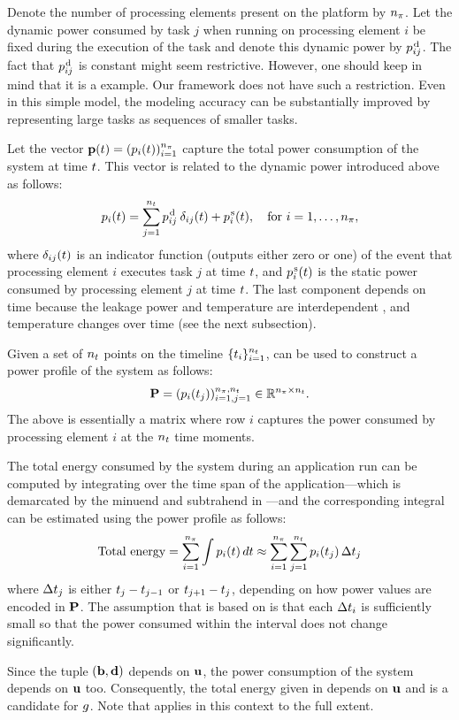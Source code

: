 Denote the number of processing elements present on the platform by ${n_\pi}$. Let
the dynamic power consumed by task $j$ when running on processing element $i$ be
fixed during the execution of the task and denote this dynamic power by
$p^{\text{\kern0.1emd}}_{ij}$. The fact that $p^{\text{\kern0.1emd}}_{ij}$ is constant might seem
restrictive. However, one should keep in mind that it is a example. Our
framework does not have such a restriction. Even in this simple model, the
modeling accuracy can be substantially improved by representing large tasks as
sequences of smaller tasks.

Let the vector $\mathbf{p}(t) = (p_i(t))_{i = 1}^{{n_\pi}}$ capture the total power
consumption of the system at time $t$. This vector is related to the dynamic
power introduced above as follows:
\begin{equation} \elab{power}
  \p_i(\t) = \sum_{j = 1}^\nt \p^\dynamic_{ij} \: \delta_{ij} (\t) + \p^\static_i(\t), \hspace{1em} \text{for $i = 1, \dots, \np$},
\end{equation}
where $\delta_{ij}(t)$ is an indicator function (outputs either zero or one) of
the event that processing element $i$ executes task $j$ at time $t$, and
$p^{\text{\kern0.1ems}}_i(t)$ is the static power consumed by processing element $j$ at
time $t$. The last component depends on time because the leakage power and
temperature are interdependent \cite{liu2007}, and temperature changes over time
(see the next subsection).

Given a set of ${n_t}$ points on the timeline $\{ t_i \}_{i = 1}^{n_t}$,
 can be used to construct a power profile of the system as follows:
\[
  \mathbf{P} = (p_i(t_j))_{i = 1, j = 1}^{{n_\pi}, {n_t}} \in \mathbb{R}^{{n_\pi} \times {n_t}}.
\]
The above is essentially a matrix where row $i$ captures the power consumed by
processing element $i$ at the ${n_t}$ time moments.

The total energy consumed by the system during an application run can be
computed by integrating  over the time span of the
application---which is demarcated by the minuend and subtrahend in
---and the corresponding integral can be estimated using
the power profile as follows:
\begin{equation} \elab{total-energy}
  \text{Total energy} = \sum_{i = 1}^\np \int \p_i(\t) \, \d\t \approx \sum_{i = 1}^\np \sum_{j = 1}^\ns \p_i(\t_j) \, \Delta\t_j
\end{equation}
where $\Delta t_j$ is either $t_j - t_{j - 1}$ or $t_{j + 1} - t_j$,
depending on how power values are encoded in $\mathbf{P}$. The assumption that
 is based on is that each $\Delta t_i$ is sufficiently small
so that the power consumed within the interval does not change significantly.

Since the tuple $(\mathbf{b}, \mathbf{d})$ depends on $\mathbf{u}$, the power consumption of the
system depends on $\mathbf{u}$ too. Consequently, the total energy given in
 depends on $\mathbf{u}$ and is a candidate for $g$. Note that
 applies in this context to the full extent.
